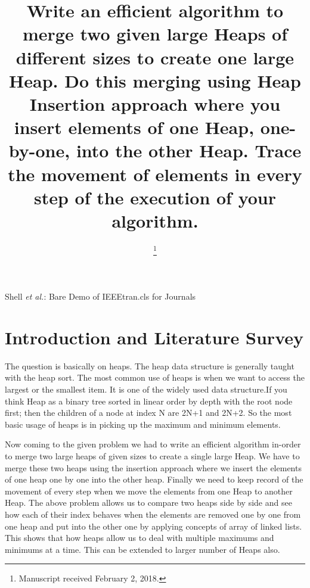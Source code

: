 \documentclass[conference]{IEEEtran}
\begin{document}
\title{Write an efficient algorithm to merge two given large Heaps of different sizes to create one large Heap. Do this merging using Heap Insertion approach where you insert elements of one Heap, one-by-one, into the other Heap. Trace the movement of elements in every step of the execution of your algorithm. }

\author{
\and
{}
\and
{}
\and
{}
\thanks{Manuscript received February 2, 2018.}}

{Shell \MakeLowercase{\textit{et al.}}: Bare Demo of IEEEtran.cls for Journals}

\maketitle

\IEEEpeerreviewmaketitle

\section{\textbf{Introduction and Literature Survey}}

The question is basically on heaps. The heap data structure is generally taught with the heap sort. The most common use of heaps is when we want to access the largest or the smallest item. It is one of the widely used data structure.If you think Heap as a binary tree sorted in linear order by depth with the root node first; then the children of a node at index N are 2N+1 and 2N+2. So the most basic usage of heaps is in picking up the maximum and minimum elements.

Now coming to the given problem we had to write an efficient algorithm in-order to merge two large heaps of given sizes to create a single large Heap. We have to merge these two heaps using the insertion approach where we insert the elements of one heap one by one into the other heap. Finally we need to keep record of the movement of every step when we move the elements from one Heap to another Heap. The above problem allows us to compare two heaps side by side and see how each of their index behaves when the elements are removed one by one from one heap and put into the other one by applying concepts of array of linked lists. This shows that how heaps allow us to deal with multiple maximums and minimums at a time. This can be extended to larger number of Heaps also.
\end{document}
